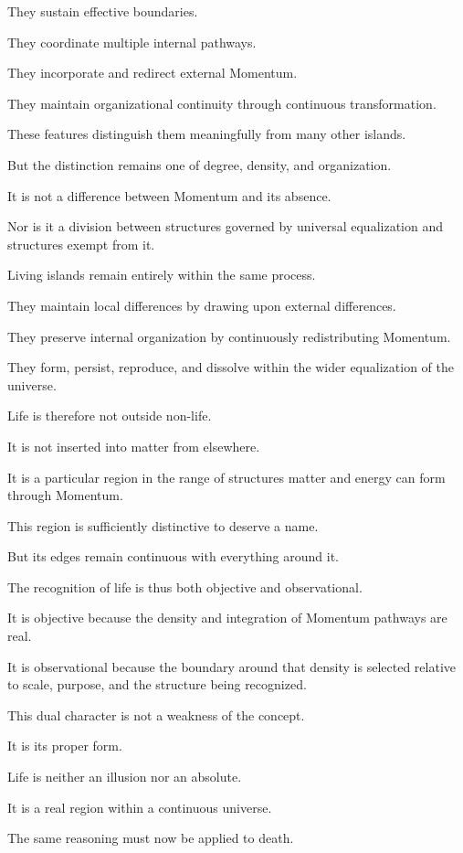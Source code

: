 They sustain effective boundaries.

They coordinate multiple internal pathways.

They incorporate and redirect external Momentum.

They maintain organizational continuity through continuous transformation.

These features distinguish them meaningfully from many other islands.

But the distinction remains one of degree, density, and organization.

It is not a difference between Momentum and its absence.

Nor is it a division between structures governed by universal equalization and structures exempt from it.

Living islands remain entirely within the same process.

They maintain local differences by drawing upon external differences.

They preserve internal organization by continuously redistributing Momentum.

They form, persist, reproduce, and dissolve within the wider equalization of the universe.

Life is therefore not outside non-life.

It is not inserted into matter from elsewhere.

It is a particular region in the range of structures matter and energy can form through Momentum.

This region is sufficiently distinctive to deserve a name.

But its edges remain continuous with everything around it.

The recognition of life is thus both objective and observational.

It is objective because the density and integration of Momentum pathways are real.

It is observational because the boundary around that density is selected relative to scale, purpose, and the structure being recognized.

This dual character is not a weakness of the concept.

It is its proper form.

Life is neither an illusion nor an absolute.

It is a real region within a continuous universe.

The same reasoning must now be applied to death.

